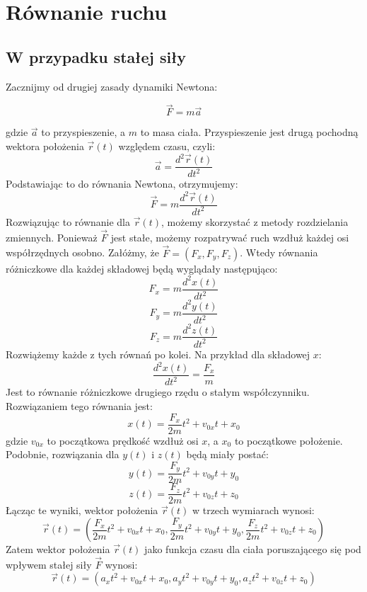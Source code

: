 \documentclass{article}
\theoremstyle{definition}
\theoremstyle{definition}
\theoremstyle{definition}
\theoremstyle{definition}
\begin{document}
\section{Równanie ruchu}
\subsection{W przypadku stałej siły}
Zacznijmy od drugiej zasady dynamiki Newtona:

\[ \vec{F} = m \vec{a} \]

gdzie \( \vec{a} \) to przyspieszenie, a \( m \) to masa ciała. Przyspieszenie jest drugą pochodną wektora położenia \( \vec{r}(t) \) względem czasu, czyli:
\[ \vec{a} = \frac{d^2 \vec{r}(t)}{dt^2} \]
Podstawiając to do równania Newtona, otrzymujemy:
\[ \vec{F} = m \frac{d^2 \vec{r}(t)}{dt^2} \]
Rozwiązując to równanie dla \( \vec{r}(t) \), możemy skorzystać z metody rozdzielania zmiennych. Ponieważ \( \vec{F} \) jest stałe, możemy rozpatrywać ruch wzdłuż każdej osi współrzędnych osobno.
Załóżmy, że \( \vec{F} = (F_x, F_y, F_z) \). Wtedy równania różniczkowe dla każdej składowej będą wyglądały następująco:
\[ F_x = m \frac{d^2 x(t)}{dt^2} \]
\[ F_y = m \frac{d^2 y(t)}{dt^2} \]
\[ F_z = m \frac{d^2 z(t)}{dt^2} \]
Rozwiążemy każde z tych równań po kolei. Na przykład dla składowej \( x \):
\[ \frac{d^2 x(t)}{dt^2} = \frac{F_x}{m} \]
Jest to równanie różniczkowe drugiego rzędu o stałym współczynniku. Rozwiązaniem tego równania jest:
\[ x(t) = \frac{F_x}{2m} t^2 + v_{0x} t + x_0 \]
gdzie \( v_{0x} \) to początkowa prędkość wzdłuż osi \( x \), a \( x_0 \) to początkowe położenie.
Podobnie, rozwiązania dla \( y(t) \) i \( z(t) \) będą miały postać:
\[ y(t) = \frac{F_y}{2m} t^2 + v_{0y} t + y_0 \]
\[ z(t) = \frac{F_z}{2m} t^2 + v_{0z} t + z_0 \]
Łącząc te wyniki, wektor położenia \( \vec{r}(t) \) w trzech wymiarach wynosi:
\[ \vec{r}(t) = \left( \frac{F_x}{2m} t^2 + v_{0x} t + x_0, \frac{F_y}{2m} t^2 + v_{0y} t + y_0, \frac{F_z}{2m} t^2 + v_{0z} t + z_0 \right) \]
Zatem wektor położenia \( \vec{r}(t) \) jako funkcja czasu dla ciała poruszającego się pod wpływem stałej siły \( \vec{F} \) wynosi:
\[
\boxed{
\vec{r}(t) = \left( a_x t^2 + v_{0x} t + x_0, a_y t^2 + v_{0y} t + y_0, a_z t^2 + v_{0z} t + z_0 \right)
}
\]
\end{document}
